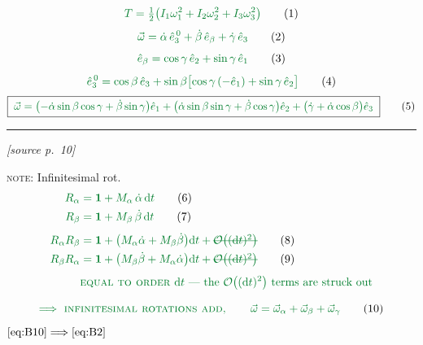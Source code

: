\documentclass[11pt]{article}
\newcommand{\ehat}[1]{\hat{e}_{#1}}
\newcommand{\ezero}[1]{\hat{e}^{\,0}_{#1}}
\newcommand{\mstruck}[1]{\text{\retracted{\ensuremath{#1}}}}
\newcommand{\src}[1]{\par\nobreak\vspace{-4pt}\hfill{\footnotesize\itshape[source p.~#1]}\par\nobreak\vspace{2pt}}
\begin{document}
\begin{gather*}
\textcolor{lecgreen}{T = \tfrac{1}{2}\bigl(I_1\omega_1^{2} + I_2\omega_2^{2} + I_3\omega_3^{2}\bigr)}
\tag{1}\label{eq:B1}\\[4pt]
\textcolor{lecgreen}{\vec{\omega} = \dot{\alpha}\,\ezero{3} + \dot{\beta}\,\ehat{\beta} + \dot{\gamma}\,\ehat{3}}
\tag{2}\label{eq:B2}\\[4pt]
\textcolor{lecgreen}{\ehat{\beta} = \cos\gamma\,\ehat{2} + \sin\gamma\,\ehat{1}}
\tag{3}\label{eq:B3}\\[4pt]
\textcolor{lecgreen}{\ezero{3} = \cos\beta\,\ehat{3}
+ \sin\beta\bigl[\cos\gamma\,(-\ehat{1}) + \sin\gamma\,\ehat{2}\bigr]}
\tag{4}\label{eq:B4}
\end{gather*}
\begin{equation*}
\boxed{\textcolor{lecgreen}{\;
\vec{\omega} = \bigl(-\dot{\alpha}\sin\beta\cos\gamma + \dot{\beta}\sin\gamma\bigr)\ehat{1}
+ \bigl(\dot{\alpha}\sin\beta\sin\gamma + \dot{\beta}\cos\gamma\bigr)\ehat{2}
+ \bigl(\dot{\gamma} + \dot{\alpha}\cos\beta\bigr)\ehat{3}\;}}
\tag{5}\label{eq:B5}
\end{equation*}

\bigskip\hrule\bigskip

\src{10}
\textcolor{lecgreen}{\textsc{note}: Infinitesimal rot.}
\begin{align*}
\textcolor{lecgreen}{R_\alpha} &\textcolor{lecgreen}{{}= \mathbf{1} + M_\alpha\,\dot{\alpha}\,\d t}
\tag{6}\label{eq:B6}\\
\textcolor{lecgreen}{R_\beta} &\textcolor{lecgreen}{{}= \mathbf{1} + M_\beta\,\dot{\beta}\,\d t}
\tag{7}\label{eq:B7}\\[4pt]
\textcolor{lecgreen}{R_\alpha R_\beta}
&\textcolor{lecgreen}{{}= \mathbf{1} + \bigl(M_\alpha\dot{\alpha}+M_\beta\dot{\beta}\bigr)\d t
+ \mstruck{\mathcal{O}\bigl((\d t)^{2}\bigr)}}
\tag{8}\label{eq:B8}\\
\textcolor{lecgreen}{R_\beta R_\alpha}
&\textcolor{lecgreen}{{}= \mathbf{1} + \bigl(M_\beta\dot{\beta}+M_\alpha\dot{\alpha}\bigr)\d t
+ \mstruck{\mathcal{O}\bigl((\d t)^{2}\bigr)}}
\tag{9}\label{eq:B9}\\[4pt]
&\textcolor{lecgreen}{\text{\textsc{equal to order} }\d t \text{ --- the }
\mathcal{O}\bigl((\d t)^{2}\bigr)\text{ terms are struck out}}
\end{align*}

\begin{equation*}
\textcolor{lecgreen}{\Longrightarrow\ \textsc{infinitesimal rotations add},\qquad
\vec{\omega} = \vec{\omega}_\alpha + \vec{\omega}_\beta + \vec{\omega}_\gamma}
\tag{10}\label{eq:B10}
\end{equation*}
\hfill$\eqref{eq:B10} \Longrightarrow \eqref{eq:B2}$
\end{document}
